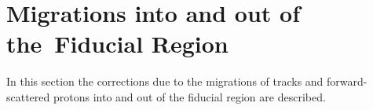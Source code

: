 \chapter{Migrations into and out of the~Fiducial Region}\label{section:star_migrations}
In this section the corrections due to the migrations of tracks and forward-scattered protons into and out of the fiducial region  are described.
%





